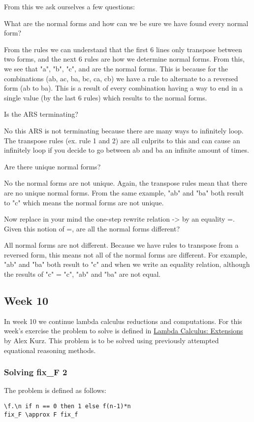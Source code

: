 \documentclass{article}
\theoremstyle{theorem}
\theoremstyle{definition}
\theoremstyle{remark}
\begin{document}
From this we ask ourselves a few questions:

\medskip
What are the normal forms and how can we be sure we have found every normal form?

\noindent From the rules we can understand that the first 6 lines only transpose between two forms, and the next 6 rules are how we determine normal forms. From this, we see that "a", "b", "c", and {} are the normal forms. This is because for the combinations (ab, ac, ba, bc, ca, cb) we have a rule to alternate to a reversed form (ab to ba). This is a result of every combination having a way to end in a single value (by the last 6 rules) which results to the normal forms.

\medskip
Is the ARS terminating?

\noindent
No this ARS is not terminating because there are many ways to infinitely loop. The transpose rules (ex. rule 1 and 2) are all culprits to this and can cause an infinitely loop if you decide to go between ab and ba an infinite amount of times.

\medskip
Are there unique normal forms?

\noindent
No the normal forms are not unique. Again, the transpose rules mean that there are no unique normal forms. From the same example, "ab" and "ba" both result to "c" which means the normal forms are not unique.

\medskip
Now replace in your mind the one-step rewrite relation -> by an equality =. Given this notion of =, are all the normal forms different?

\noindent
All normal forms are not different. Because we have rules to transpose from a reversed form, this means not all of the normal forms are different. For example, "ab" and "ba" both result to "c" and when we write an equality relation, although the results of "c" = "c", "ab" and "ba" are not equal.

\subsection{Week 10}
In week 10 we continue lambda calculus reductions and computations. For this week's exercise the problem to solve is defined in \href{https://hackmd.io/@alexhkurz/rJEeYqZtw}{Lambda Calculus: Extensions} by Alex Kurz. This problem is to be solved using previously attempted equational reasoning methods.

\subsubsection{Solving fix\_F 2}
The problem is defined as follows:
\begin{lstlisting}
\f.\n if n == 0 then 1 else f(n-1)*n
fix_F \approx F fix_f
\end{lstlisting}
\end{document}
